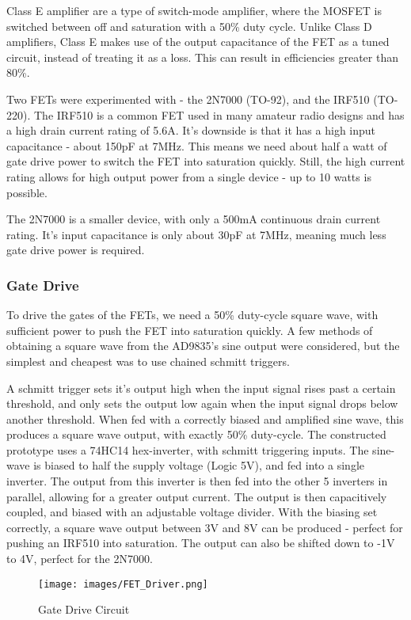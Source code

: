 \documentclass[a4paper,12pt]{article}
\begin{document}
Class E amplifier are a type of switch-mode amplifier, where the MOSFET is switched between off and saturation with a 50\% duty cycle. Unlike Class D amplifiers, Class E makes use of the output capacitance of the FET as a tuned circuit, instead of treating it as a loss. This can result in efficiencies greater than 80\%.

Two FETs were experimented with - the 2N7000 (TO-92), and the IRF510 (TO-220). The IRF510 is a common FET used in many amateur radio designs and has a high drain current rating of 5.6A. It's downside is that it has a high input capacitance - about 150pF at 7MHz. This means we need about half a watt of gate drive power to switch the FET into saturation quickly. Still, the high current rating allows for high output power from a single device - up to 10 watts is possible.

The 2N7000 is a smaller device, with only a 500mA continuous drain current rating. It's input capacitance is only about 30pF at 7MHz, meaning much less gate drive power is required. 


\subsubsection{Gate Drive}
To drive the gates of the FETs, we need a 50\% duty-cycle square wave, with sufficient power to push the FET into saturation quickly. A few methods of obtaining a square wave from the AD9835's sine output were considered, but the simplest and cheapest was to use chained schmitt triggers.

A schmitt trigger sets it's output high when the input signal rises past a certain threshold, and only sets the output low again when the input signal drops below another threshold. When fed with a correctly biased and amplified sine wave, this produces a square wave output, with exactly 50\% duty-cycle. The constructed prototype uses a 74HC14 hex-inverter, with schmitt triggering inputs. The sine-wave is biased to half the supply voltage (Logic 5V), and fed into a single inverter. The output from this inverter is then fed into the other 5 inverters in parallel, allowing for a greater output current. The output is then capacitively coupled, and biased with an adjustable voltage divider. With the biasing set correctly, a square wave output between 3V and 8V can be produced - perfect for pushing an IRF510 into saturation. The output can also be shifted down to -1V to 4V, perfect for the 2N7000.

\begin{figure}[h]
  \begin{center}
    \texttt{[image: images/FET\_Driver.png]}
  \end{center}
  \caption{Gate Drive Circuit}
  \label{fig:fet_drive}
\end{figure}
\end{document}
